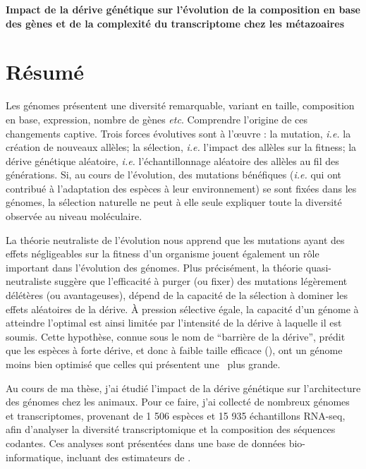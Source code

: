 \thispagestyle{empty}
\vspace*{-80pt}

\begin{center}
	\Large
        \vspace*{-5pt}
	\textbf{Impact de la dérive génétique sur l'évolution de la composition en base des gènes et de la complexité du transcriptome chez les métazoaires}
\end{center}

\section*{\large{Résumé}}
\vspace*{-5pt}

Les génomes présentent une diversité remarquable, variant en taille, composition en base, expression, nombre de gènes \textit{etc}. Comprendre l'origine de ces changements captive. Trois forces évolutives sont à l'œuvre%
: la mutation, \textit{i.e.} la création de nouveaux allèles; la sélection, \textit{i.e.} l'impact des allèles sur la fitness; la dérive génétique aléatoire, \textit{i.e.} l'échantillonnage aléatoire des allèles au fil des générations. Si, au cours de l’évolution, des mutations bénéfiques (\textit{i.e.} qui ont contribué à l'adaptation des espèces à leur environnement) se sont fixées dans les génomes, la sélection naturelle ne peut à elle seule expliquer toute la diversité observée au niveau moléculaire.

La théorie neutraliste de l'évolution nous apprend que les mutations ayant des effets négligeables sur la fitness d'un organisme jouent également un rôle important dans l'évolution des génomes.
Plus précisément, la théorie quasi-neutraliste suggère que l'efficacité à purger (ou fixer) des mutations légèrement délétères (ou avantageuses), dépend de la capacité de la sélection à dominer les effets aléatoires de la dérive.
À pression sélective égale, la capacité d'un génome à atteindre l'optimal est ainsi limitée par l'intensité de la dérive à laquelle il est soumis. Cette hypothèse, connue sous le nom de “barrière de la dérive”, prédit que les espèces à forte dérive, et donc à faible taille efficace (\Ne), ont un génome moins bien optimisé que celles qui présentent une \Ne~plus grande.

Au cours de ma thèse, j'ai étudié l'impact de la dérive génétique sur l'architecture des génomes chez les animaux. Pour ce faire, j'ai collecté de nombreux génomes et transcriptomes, provenant de 1 506 espèces et 15 935 échantillons RNA-seq, afin d'analyser la diversité transcriptomique et la composition des séquences codantes. Ces analyses sont présentées dans une base de données bio-informatique, incluant des estimateurs de \Ne.

